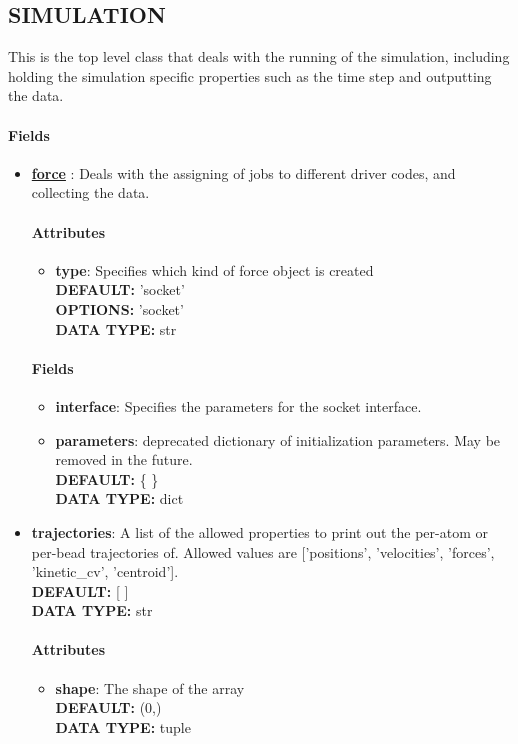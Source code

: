\subsection{SIMULATION}
\label{SIMULATION}
This is the top level class that deals with the running of the simulation, including holding the simulation specific properties such as the time step and outputting the data.
\paragraph{Fields}
 \begin{itemize}
\item {\bf \hyperref[FORCES]{force} }:
 Deals with the assigning of jobs to different driver codes, and collecting the data.
\paragraph{Attributes}
 \begin{itemize}
\item {\bf type}:
 Specifies which kind of force object is created
{\\ \bf DEFAULT: }'socket'
{\\ \bf OPTIONS: }'socket'
{\\ \bf DATA TYPE: }str
\end{itemize}
 
\paragraph{Fields}
 \begin{itemize}
\item {\bf interface}:
 Specifies the parameters for the socket interface.
\item {\bf parameters}:
 deprecated dictionary of initialization parameters. May be removed in the future.
{\\ \bf DEFAULT: }\{ \}
{\\ \bf DATA TYPE: }dict
\end{itemize}
 
\item {\bf trajectories}:
 A list of the allowed properties to print out the per-atom or per-bead trajectories of. Allowed values are ['positions', 'velocities', 'forces', 'kinetic\_cv', 'centroid'].
{\\ \bf DEFAULT: }[ ]
{\\ \bf DATA TYPE: }str
\paragraph{Attributes}
 \begin{itemize}
\item {\bf shape}:
 The shape of the array
{\\ \bf DEFAULT: }(0,)
{\\ \bf DATA TYPE: }tuple
\end{itemize}
 

\end{itemize}

